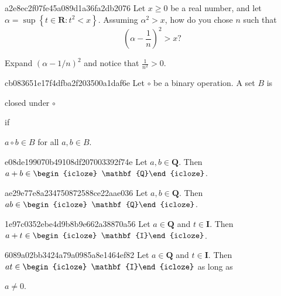 \begin{note}{a2e8ec2f07fe45a089d1a36fa2db2076}
    Let \({ x \geq 0 }\) be a real number, and let \({ \alpha = \sup \left\{ t \in \mathbf{R} : t^2 < x \right\} }\).
    Assuming \({ \alpha^2 > x }\), how do you chose \({ n }\) such that
    \[
            \left( \alpha - \frac{1}{n} \right)^2 > x?
    \]

    \begin{cloze}{1}
        Expand \({ \left( \alpha - 1/n \right)^2 }\) and notice that \({ \frac{1}{n^2} > 0 }\).
    \end{cloze}
\end{note}

\begin{note}{cb083651e17f4dfba2f203500a1daf6e}
    Let \({ \circ }\) be a binary operation. A set \({ B }\) is \begin{icloze}{2}closed under \({ \circ }\)\end{icloze} if
    \begin{icloze}{1}
        \begin{center}
            \({ a \circ b \in B }\) for all \({ a, b \in B }\).
        \end{center}
    \end{icloze}
\end{note}

\begin{note}{e08de199070b49108df207003392f74e}
    Let \({ a, b \in \mathbf{Q} }\).
    Then \({ a + b \in \begin{icloze}{1}\mathbf{Q}\end{icloze} }\).
\end{note}

\begin{note}{ae29e77e8a234750872588ce22aae036}
    Let \({ a, b \in \mathbf{Q} }\).
    Then \({ ab \in \begin{icloze}{1}\mathbf{Q}\end{icloze} }\).
\end{note}

\begin{note}{1e97c0352ebe4d9b8b9e662a38870a56}
    Let \({ a \in \mathbf{Q} }\) and \({ t \in \mathbf{I} }\).
    Then \({ a + t \in \begin{icloze}{1}\mathbf{I}\end{icloze} }\).
\end{note}

\begin{note}{6089a02bb3424a79a0985a8e1464ef82}
    Let \({ a \in \mathbf{Q} }\) and \({ t \in \mathbf{I} }\).
    Then \({ at \in \begin{icloze}{1}\mathbf{I}\end{icloze} }\) as long as \begin{icloze}{2}\({ a \neq 0 }\).\end{icloze}
\end{note}

